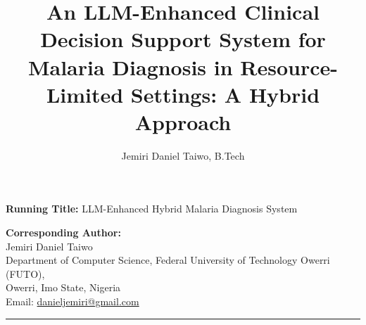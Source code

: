 \documentclass[12pt,a4paper]{article}
\begin{document}
\title{\textbf{An LLM-Enhanced Clinical Decision Support System for Malaria Diagnosis in Resource-Limited Settings: A Hybrid Approach}}

\author[1]{Jemiri Daniel Taiwo, B.Tech}

\date{}

\maketitle

\noindent\textbf{Running Title:} LLM-Enhanced Hybrid Malaria Diagnosis System

\noindent\textbf{Corresponding Author:}\\
Jemiri Daniel Taiwo\\
Department of Computer Science, Federal University of Technology Owerri (FUTO),\\
Owerri, Imo State, Nigeria\\
Email: \href{mailto:danieljemiri@gmail.com}{danieljemiri@gmail.com}

\vspace{1em}
\hrule
\vspace{1em}
\end{document}
